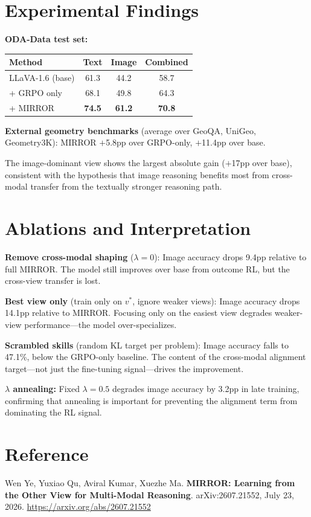 \documentclass[10pt,twocolumn]{article}
\begin{document}
\section{Experimental Findings}

\textbf{ODA-Data test set:}

\begin{center}\small
\begin{tabular}{lccc}
\toprule
Method & Text & Image & Combined \\
\midrule
LLaVA-1.6 (base) & 61.3 & 44.2 & 58.7 \\
+ GRPO only & 68.1 & 49.8 & 64.3 \\
+ MIRROR & \textbf{74.5} & \textbf{61.2} & \textbf{70.8} \\
\bottomrule
\end{tabular}
\end{center}

\textbf{External geometry benchmarks} (average over GeoQA, UniGeo,
Geometry3K): MIRROR $+$5.8pp over GRPO-only, $+$11.4pp over base.

The image-dominant view shows the largest absolute gain ($+$17pp over
base), consistent with the hypothesis that image reasoning benefits most
from cross-modal transfer from the textually stronger reasoning path.

\section{Ablations and Interpretation}

\textbf{Remove cross-modal shaping} ($\lambda = 0$): Image accuracy
drops 9.4pp relative to full MIRROR. The model still improves over
base from outcome RL, but the cross-view transfer is lost.

\textbf{Best view only} (train only on $v^*$, ignore weaker views):
Image accuracy drops 14.1pp relative to MIRROR. Focusing only on the
easiest view degrades weaker-view performance---the model over-specializes.

\textbf{Scrambled skills} (random KL target per problem): Image accuracy
falls to 47.1\%, below the GRPO-only baseline. The content of the
cross-modal alignment target---not just the fine-tuning signal---drives
the improvement.

\textbf{$\lambda$ annealing:} Fixed $\lambda = 0.5$ degrades image
accuracy by 3.2pp in late training, confirming that annealing is
important for preventing the alignment term from dominating the RL
signal.

\section*{Reference}

Wen Ye, Yuxiao Qu, Aviral Kumar, Xuezhe Ma.
\textbf{MIRROR: Learning from the Other View for Multi-Modal Reasoning}.
arXiv:2607.21552, July 23, 2026.
\url{https://arxiv.org/abs/2607.21552}
\end{document}
